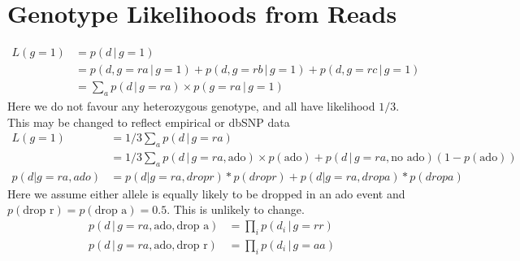 \documentclass{article}
\begin{document}
\section{Genotype Likelihoods from Reads}
\begin{align*}
L(g=1) &= p(d\,|\,g=1)\\
&=p(d, g=ra \,|\, g=1) + p(d, g=rb \,|\, g=1) + p(d, g=rc \,|\, g=1)\\
&= \sum_a p(d \,|\, g=ra) \times p(g=ra \,|\, g=1)
\end{align*}
Here we do not favour any heterozygous genotype, and all have likelihood $1/3$. This may be changed to reflect empirical or dbSNP data
\begin{align*}
L(g=1) &= 1/3 \sum_a p(d \,|\, g=ra)\\
&= 1/3 \sum_a p(d \,|\, g=ra, \text{ado}) \times p(\text{ado}) + p(d \,|\, g=ra, \text{no ado})(1-p(\text{ado}))\\
p(d|g=ra, ado) &= p(d|g=ra, drop r) * p(drop r) + p(d|g=ra, drop a) * p(drop a)
\end{align*}
Here we assume either allele is equally likely to be dropped in an ado event and $p(\text{drop r}) = p(\text{drop a}) = 0.5$. This is unlikely to change.
\begin{align*}
p(d \,|\, g=ra, \text{ado}, \text{drop a}) &= \prod_i p(d_i \,|\, g=rr)\\
p(d \,|\, g=ra, \text{ado}, \text{drop r}) &= \prod_i p(d_i \,|\, g=aa)
\end{align*}
\end{document}
